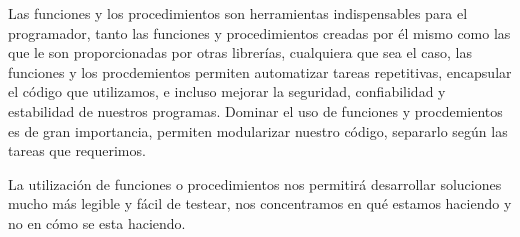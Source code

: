 Las funciones y los procedimientos son  herramientas indispensables para el programador, tanto las funciones y procedimientos creadas por él mismo como las que le son proporcionadas por otras librerías, cualquiera que sea el caso, las funciones y los procdemientos permiten automatizar tareas repetitivas, encapsular el código que utilizamos, e incluso mejorar la seguridad, confiabilidad y estabilidad de nuestros programas. Dominar el uso de funciones y procdemientos es de gran importancia, permiten modularizar nuestro código, separarlo según las tareas que requerimos.

La utilización de funciones o procedimientos nos permitirá desarrollar soluciones mucho más legible y fácil de testear, nos concentramos en qué estamos haciendo y no en cómo se esta haciendo.